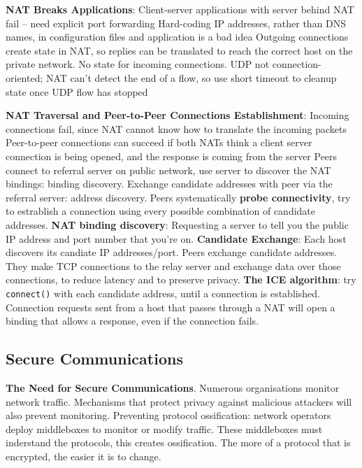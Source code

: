 \documentclass{article}
\begin{document}
\textbf{NAT Breaks Applications}:
Client-server applications with server behind NAT fail – need explicit port forwarding
Hard-coding IP addresses, rather than DNS names, in configuration files and application is a bad idea
Outgoing connections create state in NAT, so replies can be translated to reach the correct host on the private network.
No state for incoming connections.
UDP not connection-oriented; NAT can’t detect the end of a flow, so use short timeout to cleanup state once UDP flow has stopped

\textbf{NAT Traversal and Peer-to-Peer Connections Establishment}:
Incoming connections fail, since NAT cannot know how to translate the incoming packets
Peer-to-peer connections can succeed if both NATs think a client server connection is being opened, and the response is coming from the server
Peers connect to referral server on public network, use server to discover the NAT bindings: binding discovery.
Exchange candidate addresses with peer via the referral server: address discovery.
Peers systematically \textbf{probe connectivity}, try to estrablish a connection using every possible combination of candidate addresses.
\textbf{NAT binding discovery}: Requesting a server to tell you the public IP address and port number that you're on.
\textbf{Candidate Exchange}: Each host discovers its candiate IP addresses/port. Peers exchange candidate addresses.
They make TCP connections to the relay server and exchange data over those connections, to reduce latency and to preserve privacy.
\textbf{The ICE algorithm}: try \texttt{connect()} with each candidate address, until a connection is established.
Connection requests sent from a host that passes through a NAT will open a binding that allows a response, even if the connection fails.


\subsection*{Secure Communications}

\textbf{The Need for Secure Communications}. Numerous organisations monitor network traffic.
Mechanisms that protect privacy against malicious attackers will also prevent monitoring.
Preventing protocol ossification: network operators deploy middleboxes to monitor or modify traffic.
These middleboxes must inderstand the protocols, this creates ossification.
The more of a protocol that is encrypted, the easier it is to change.
\end{document}
